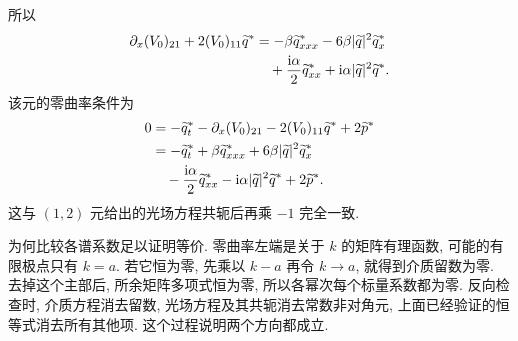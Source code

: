 所以
\begin{align*}
\partial_x(V_0)_{21}+2(V_0)_{11}{\widetilde q}^{*}
&=-\beta{\widetilde q_{xxx}}^{*}
-6\beta|\widetilde q|^2{\widetilde q_x}^{*}\\
&\quad+\dfrac{\mathrm{i}\alpha}{2}{\widetilde q_{xx}}^{*}
+\mathrm{i}\alpha|\widetilde q|^2{\widetilde q}^{*}.
\end{align*}
该元的零曲率条件为
\begin{align*}
0&=-{\widetilde q_t}^{*}
-\partial_x(V_0)_{21}
-2(V_0)_{11}{\widetilde q}^{*}
+2{\widetilde p}^{*}\\
&=-{\widetilde q_t}^{*}
+\beta{\widetilde q_{xxx}}^{*}
+6\beta|\widetilde q|^2{\widetilde q_x}^{*}\\
&\quad-\dfrac{\mathrm{i}\alpha}{2}{\widetilde q_{xx}}^{*}
-\mathrm{i}\alpha|\widetilde q|^2{\widetilde q}^{*}
+2{\widetilde p}^{*}.
\end{align*}
这与 $(1,2)$ 元给出的光场方程共轭后再乘 $-1$ 完全一致.
\par\smallskip\noindent 为何比较各谱系数足以证明等价.\quad
零曲率左端是关于 $k$ 的矩阵有理函数, 可能的有限极点只有 $k=a$. 若它恒为零, 先乘以 $k-a$ 再令 $k\to a$, 就得到介质留数为零. 去掉这个主部后, 所余矩阵多项式恒为零, 所以各幂次每个标量系数都为零. 反向检查时, 介质方程消去留数, 光场方程及其共轭消去常数非对角元, 上面已经验证的恒等式消去所有其他项. 这个过程说明两个方向都成立.

